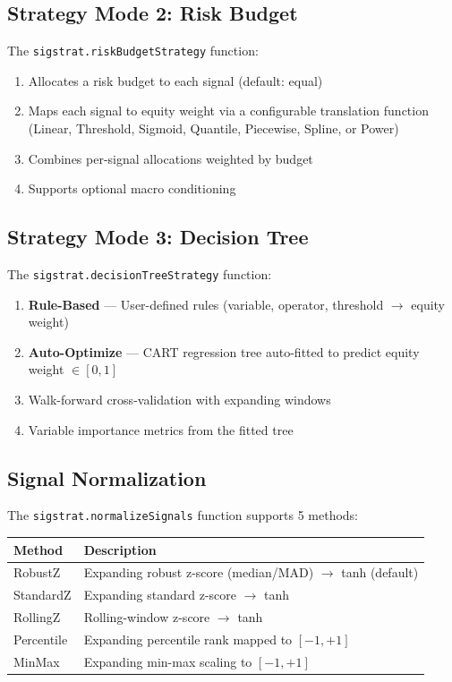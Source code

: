 \documentclass[11pt,a4paper]{article}
\begin{document}
\subsection{Strategy Mode 2: Risk Budget}
The \texttt{sigstrat.riskBudgetStrategy} function:
\begin{enumerate}[leftmargin=2em]
  \item Allocates a risk budget to each signal (default: equal)
  \item Maps each signal to equity weight via a configurable translation function (Linear, Threshold, Sigmoid, Quantile, Piecewise, Spline, or Power)
  \item Combines per-signal allocations weighted by budget
  \item Supports optional macro conditioning
\end{enumerate}

\subsection{Strategy Mode 3: Decision Tree}
The \texttt{sigstrat.decisionTreeStrategy} function:
\begin{enumerate}[leftmargin=2em]
  \item \textbf{Rule-Based} --- User-defined rules (variable, operator, threshold $\rightarrow$ equity weight)
  \item \textbf{Auto-Optimize} --- CART regression tree auto-fitted to predict equity weight $\in [0,1]$
  \item Walk-forward cross-validation with expanding windows
  \item Variable importance metrics from the fitted tree
\end{enumerate}

\subsection{Signal Normalization}
The \texttt{sigstrat.normalizeSignals} function supports 5 methods:
\begin{center}
\begin{tabularx}{\textwidth}{l X}
\toprule
\textbf{Method} & \textbf{Description} \\
\midrule
RobustZ & Expanding robust z-score (median/MAD) $\rightarrow$ tanh (default) \\
StandardZ & Expanding standard z-score $\rightarrow$ tanh \\
RollingZ & Rolling-window z-score $\rightarrow$ tanh \\
Percentile & Expanding percentile rank mapped to $[-1, +1]$ \\
MinMax & Expanding min-max scaling to $[-1, +1]$ \\
\bottomrule
\end{tabularx}
\end{center}
\end{document}

